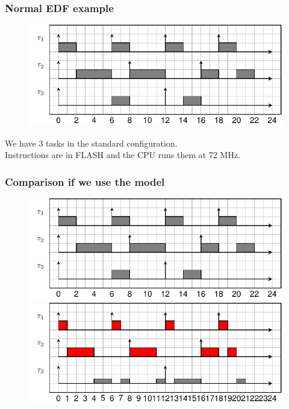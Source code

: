 \documentclass[
	11pt, %
]{beamer}
\begin{document}
\begin{frame}[fragile]
	\frametitle{ Normal EDF example }
	\begin{figure}
		\includegraphics{schedule/edf.pdf}
	\end{figure}
	We have 3 tasks in the standard configuration. \\
	Instructions are in FLASH and the CPU runs them at 72 MHz.
\end{frame}

\begin{frame}[fragile]
	\frametitle{ Comparison if we use the model  }
	\begin{figure}
		\includegraphics[scale=0.8]{schedule/edf.pdf}
		\includegraphics[scale=0.8]{schedule/offline_algo.pdf}
	\end{figure}

\end{frame}
\end{document}
